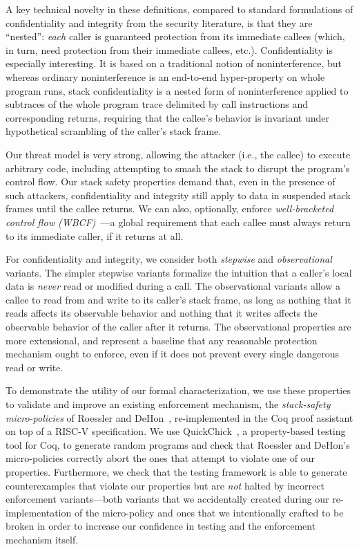 \documentclass[10pt,conference]{ieeetran}%
\theoremstyle{definition}
\begin{document}
A key technical novelty in these definitions,
compared to standard formulations of confidentiality and integrity from the
security literature, is that they
are ``nested'': {\em each} caller is guaranteed protection from its
immediate callees (which, in turn, need protection from their immediate
callees, etc.).
Confidentiality is especially interesting. It is based on a traditional
notion of noninterference, but whereas ordinary noninterference
is an end-to-end hyper-property on whole program runs, stack
confidentiality is a nested form of noninterference applied to
subtraces of the whole program trace delimited by call instructions
and corresponding returns, requiring that the callee’s behavior is
invariant under hypothetical scrambling of the caller’s stack frame.

Our threat model is very strong, allowing the attacker (i.e., the
callee) to execute arbitrary code, including attempting to smash
the stack to disrupt the program’s control flow. Our stack safety
properties demand that, even in the presence of such attackers, confidentiality
and integrity still apply to data in suspended stack frames
until the callee returns.
%
We can also, optionally, enforce {\em well-bracketed control
flow (WBCF)}~\cite{SkorstengaardSTKJFP}---a global requirement that
each callee must always return to its immediate caller, if it returns
at all.

For confidentiality and integrity, we consider both {\em stepwise}
and {\em observational} variants.  The simpler stepwise
variants formalize the intuition that a caller's local data is {\em never}
read or modified during a call. The observational variants
allow a callee to read from and write to its caller's stack frame, as
long as nothing that it reads affects its observable behavior and nothing
that it writes affects the observable behavior of the caller after it returns.
The observational properties are more extensional, and represent a baseline
that any reasonable protection mechanism ought to enforce,
even if it does not prevent every single dangerous read or write.

To demonstrate the utility of our formal characterization, we use these
properties to validate and improve an existing enforcement mechanism, the
{\em stack-safety micro-policies} of Roessler and DeHon~\cite{DBLP:conf/sp/RoesslerD18}, re-implemented
in the Coq proof assistant on top of a RISC-V specification.  We
use QuickChick~\cite{Denes:VSL2014,Pierce:SF4}, a property-based testing
tool for Coq, to generate random programs and check
that Roessler and DeHon's micro-policies correctly abort the ones that
attempt to violate one of our properties. Furthermore, we
%
check that the testing framework is able to generate counterexamples
that violate our properties but are \emph{not} halted by incorrect
enforcement variants---both variants that we accidentally created
during our re-implementation of the micro-policy and ones that we
intentionally crafted to be broken in order to increase our confidence
in testing and the enforcement mechanism itself.
\end{document}
